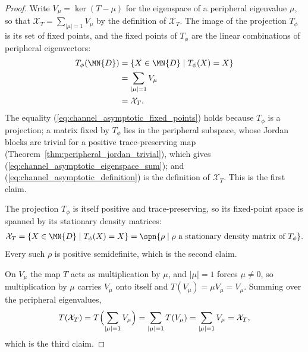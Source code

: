 \begin{proof}\leanok
    Write $V_\mu=\ker(T-\mu)$ for the eigenspace of a peripheral eigenvalue
    $\mu$, so that $\mathcal X_T=\sum_{|\mu|=1}V_\mu$ by the definition of
    $\mathcal X_T$. The image of the projection $T_\phi$ is its set of
    fixed points, and the fixed points of $T_\phi$ are the linear
    combinations of peripheral eigenvectors:
    \begin{align}
        T_\phi(\MN{D})
         & =\{X\in\MN{D}\mid T_\phi(X)=X\}
        \label{eq:channel_asymptotic_fixed_points}\\
         & =\sum_{|\mu|=1}V_\mu
        \label{eq:channel_asymptotic_eigenspace_sum}\\
         & =\mathcal X_T.
        \label{eq:channel_asymptotic_definition}
    \end{align}
    The equality (\ref{eq:channel_asymptotic_fixed_points}) holds because
    $T_\phi$ is a projection; a matrix fixed by $T_\phi$ lies in the
    peripheral subspace, whose Jordan blocks are trivial for a positive
    trace-preserving map (Theorem~\ref{thm:peripheral_jordan_trivial}),
    which gives (\ref{eq:channel_asymptotic_eigenspace_sum}); and
    (\ref{eq:channel_asymptotic_definition}) is the definition of
    $\mathcal X_T$. This is the first claim.

    The projection $T_\phi$ is itself positive and trace-preserving, so its
    fixed-point space is spanned by its stationary density matrices:
    \begin{align}
        \mathcal X_T=\{X\in\MN{D}\mid T_\phi(X)=X\}
        =\spn\{\rho\mid \rho\ \text{a stationary density matrix of }T_\phi\}.
    \end{align}
    Every such $\rho$ is positive semidefinite, which is the second claim.

    On $V_\mu$ the map $T$ acts as multiplication by $\mu$, and $|\mu|=1$
    forces $\mu\neq0$, so multiplication by $\mu$ carries $V_\mu$ onto itself
    and $T(V_\mu)=\mu V_\mu=V_\mu$. Summing over the peripheral eigenvalues,
    \begin{align}
        T(\mathcal X_T)=T\Bigl(\sum_{|\mu|=1}V_\mu\Bigr)
        =\sum_{|\mu|=1}T(V_\mu)=\sum_{|\mu|=1}V_\mu=\mathcal X_T,
    \end{align}
    which is the third claim.
\end{proof}

